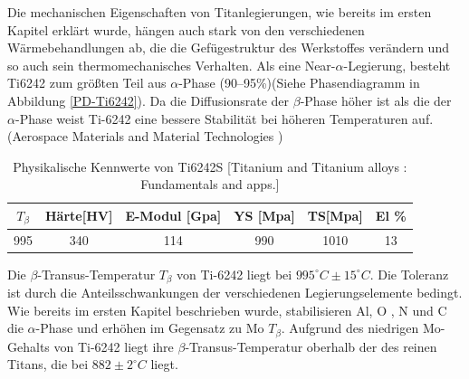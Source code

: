 Die mechanischen Eigenschaften von Titanlegierungen, wie bereits im ersten Kapitel erklärt wurde, hängen auch stark von den verschiedenen Wärmebehandlungen ab, die die Gefügestruktur des Werkstoffes  verändern und so auch sein thermomechanisches Verhalten.
Als eine Near-$\alpha$-Legierung, besteht Ti6242 zum größten Teil aus $\alpha$-Phase (90--95\%)(Siehe Phasendiagramm in Abbildung \ref{PD-Ti6242}). Da die Diffusionsrate der $\beta$-Phase höher ist als die der $\alpha$-Phase weist Ti-6242 eine bessere Stabilität bei höheren Temperaturen auf. (Aerospace Materials and Material Technologies ) 

\begin{table}[H]
	\centering	
	\begin{tabular}{|c| c| c| c| c| c|}										
		\hline
		$T_{\beta}$ & Härte[HV] & E-Modul [Gpa]& YS [Mpa]&TS[Mpa]& El \% \\
		\hline
		995&340&114&990&1010&13\\
		\hline
	\end{tabular}
	\caption{Physikalische Kennwerte von Ti6242S [Titanium and Titanium alloys  : Fundamentals and apps.]}
	\label{Mec.}
\end{table}

Die $\beta$-Transus-Temperatur $T_{\beta}$ von Ti-6242 liegt bei $995^\circ C \pm 15^\circ C$. Die Toleranz ist durch die Anteilsschwankungen der verschiedenen Legierungselemente bedingt. Wie bereits im ersten Kapitel beschrieben wurde, stabilisieren  Al, O , N und C die $\alpha$-Phase und erhöhen im Gegensatz zu Mo $T_{\beta}$.
Aufgrund des niedrigen Mo-Gehalts von Ti-6242 liegt ihre $\beta$-Transus-Temperatur oberhalb der des reinen Titans, die bei $882 \pm 2^\circ C$ liegt.


